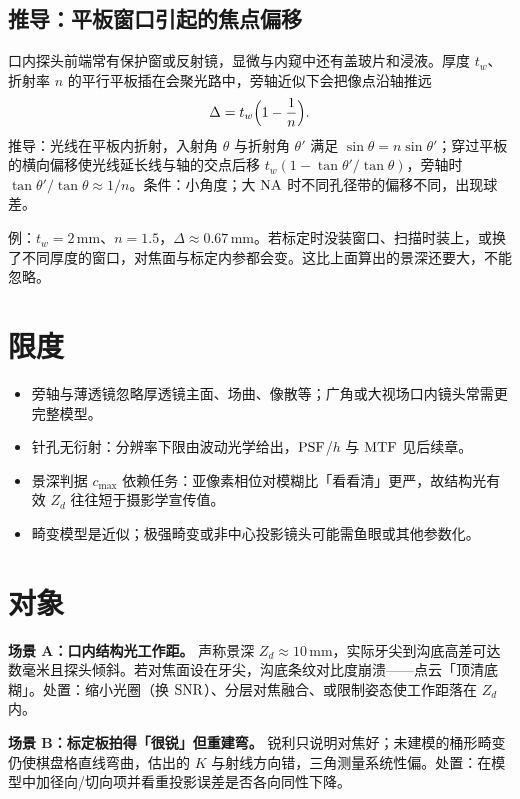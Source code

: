 \subsection{推导：平板窗口引起的焦点偏移}

口内探头前端常有保护窗或反射镜，显微与内窥中还有盖玻片和浸液。厚度 $t_w$、折射率 $n$ 的平行平板插在会聚光路中，旁轴近似下会把像点沿轴推远
\[
  \Delta=t_w\Bigl(1-\frac{1}{n}\Bigr).
\]
推导：光线在平板内折射，入射角 $\theta$ 与折射角 $\theta'$ 满足 $\sin\theta=n\sin\theta'$；穿过平板的横向偏移使光线延长线与轴的交点后移 $t_w(1-\tan\theta'/\tan\theta)$，旁轴时 $\tan\theta'/\tan\theta\approx1/n$。条件：小角度；大 $\mathrm{NA}$ 时不同孔径带的偏移不同，出现球差。

例：$t_w=2\,\mathrm{mm}$、$n=1.5$，$\Delta\approx0.67\,\mathrm{mm}$。若标定时没装窗口、扫描时装上，或换了不同厚度的窗口，对焦面与标定内参都会变。这比上面算出的景深还要大，不能忽略。

\section{限度}
\label{sec:ch01-limits}

\begin{itemize}
  \item 旁轴与薄透镜忽略厚透镜主面、场曲、像散等；广角或大视场口内镜头常需更完整模型。
  \item 针孔无衍射：分辨率下限由波动光学给出，$\mathrm{PSF}$/$h$ 与 $\mathrm{MTF}$ 见后续章。
  \item 景深判据 $c_{\max}$ 依赖任务：亚像素相位对模糊比「看看清」更严，故结构光有效 $Z_d$ 往往短于摄影学宣传值。
  \item 畸变模型是近似；极强畸变或非中心投影镜头可能需鱼眼或其他参数化。
\end{itemize}

\section{对象}
\label{sec:ch01-object}

\textbf{场景 A：口内结构光工作距。} 声称景深 $Z_d\approx 10\,\mathrm{mm}$，实际牙尖到沟底高差可达数毫米且探头倾斜。若对焦面设在牙尖，沟底条纹对比度崩溃——点云「顶清底糊」。处置：缩小光圈（换 $\mathrm{SNR}$）、分层对焦融合、或限制姿态使工作距落在 $Z_d$ 内。

\textbf{场景 B：标定板拍得「很锐」但重建弯。} 锐利只说明对焦好；未建模的桶形畸变仍使棋盘格直线弯曲，估出的 $K$ 与射线方向错，三角测量系统性偏。处置：在模型中加径向/切向项并看重投影误差是否各向同性下降。

